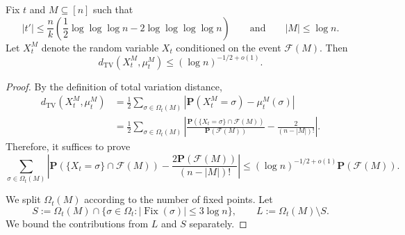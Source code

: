 \begin{prop}\label{prop:key}
    Fix $t$ and $M\subseteq [n]$ such that
    $$
        |t'|\leq \frac{n}{k}
        \left(
        \frac{1}{2}\log\log\log n
        -2\log\log\log\log n
        \right)
        \qquad\text{and}\qquad
        |M|\leq \log n.
    $$
    Let $X_t^M$ denote the random variable $X_t$ conditioned on the event
    $\mathcal F(M)$. Then
    $$
        d_{\mathrm{TV}}(X_t^M,\mu_t^M)
        \leq
        (\log n)^{-1/2+o(1)}.
    $$
\end{prop}

\begin{proof}
    By the definition of total variation distance,
    \begin{align*}
        d_{\mathrm{TV}}(X_t^M,\mu_t^M)
        &=
        \frac{1}{2}
        \sum_{\sigma\in \Omega_t(M)}
        \left|
        \mathbf P(X_t^M=\sigma)-\mu_t^M(\sigma)
        \right| \\
        &=
        \frac{1}{2}
        \sum_{\sigma\in \Omega_t(M)}
        \left|
        \frac{\mathbf P(\{X_t=\sigma\}\cap \mathcal F(M))}
        {\mathbf P(\mathcal F(M))}
        -
        \frac{2}{(n-|M|)!}
        \right|.
    \end{align*}
    Therefore, it suffices to prove
    $$
        \sum_{\sigma\in \Omega_t(M)}
        \left|
        \mathbf P(\{X_t=\sigma\}\cap \mathcal F(M))
        -
        \frac{2\mathbf P(\mathcal F(M))}{(n-|M|)!}
        \right|
        \leq
        (\log n)^{-1/2+o(1)}\mathbf P(\mathcal F(M)).
    $$

    We split $\Omega_t(M)$ according to the number of fixed points. Let
    $$
        S:=
        \Omega_t(M)\cap
        \{\sigma\in \Omega_t:|\operatorname{Fix}(\sigma)|\leq 3\log n\},
        \qquad
        L:=\Omega_t(M)\setminus S.
    $$
    We bound the contributions from $L$ and $S$ separately.


\end{proof}

